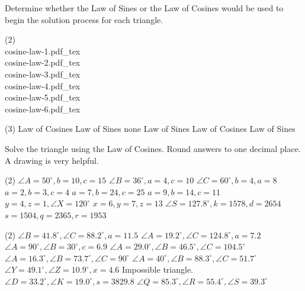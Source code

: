 \documentclass[12pt,fleqn]{book}
\newcommand{\incfig}[2][1]{%
    \def\svgwidth{#1\columnwidth}
    {#2.pdf_tex}
}
\newcommand{\prb}[1]{\begin{Exercise}\parbox[t]{\textwidth-5em}{#1}\end{Exercise}}
\newcommand{\sol}[1]{\begin{Answer}\parbox[t]{\textwidth-5em}{#1}\end{Answer}}
\begin{document}
\clearpage
\prb{
	Determine whether the Law of Sines or the Law of Cosines would be used to begin the solution process for each triangle.
	\begin{tasks}(2)
		\task \\ \incfig[0.8]{cosine-law-1} \vspace{8em}
		\task \\ \incfig[0.8]{cosine-law-2} \vspace{8em}
		\task \\ \incfig[0.8]{cosine-law-3} \vspace{8em}
		\task \\ \incfig[0.8]{cosine-law-4} \vspace{8em}
		\task \\ \incfig[0.8]{cosine-law-5} \vspace{8em}
		\task \\ \incfig[0.8]{cosine-law-6} \vspace{8em}
	\end{tasks}
}
\sol{
	\begin{tasks}(3)
		\task Law of Cosines
		\task Law of Sines
		\task none
		\task Law of Sines
		\task Law of Cosines 
		\task Law of Sines
	\end{tasks}
}
\prb{
	Solve the triangle using the Law of Cosines. Round answers to one decimal place.  A drawing is very helpful.
	\begin{tasks}(2) 
		\task $\angle A=50^{\circ}, b=10, c=15$
		\vspace{12em}
		\task $\angle B=36^{\circ}, a=4, c=10$
		\vspace{12em}
		\task $\angle C=60^{\circ}, b=4, a=8$
		\vspace{12em}
		\task $a=2, b=3, c=4$
		\vspace{12em}
		\task $a=7, b=24, c=25$
		\vspace{12em}
		\task $a=9, b=14, c=11$
		\vspace{12em}
		\task $y=4, z=1, \angle X=120^{\circ}$
		\vspace{12em}
		\task $x=6, y=7, z=13$
		\vspace{12em}
		\task $\angle S=127.8^{\circ}, k=1578, d=2654$
		\vspace{12em}
		\task $s=1504, q=2365, r=1953$
		\vspace{12em}
	\end{tasks}
}
\sol{
	\begin{tasks}(2)
		\task $\angle B=41.8^{\circ}, \angle C=88.2^{\circ}, a=11.5$
		\task $\angle A=19.2^{\circ}, \angle C=124.8^{\circ}, a=7.2$
		\task $\angle A=90^{\circ}, \angle B=30^{\circ}, c=6.9$
		\task $\angle A=29.0^{\circ}, \angle B=46.5^{\circ}, \angle C=104.5^{\circ}$
		\task $\angle A=16.3^{\circ}, \angle B=73.7^{\circ}, \angle C=90^{\circ}$
		\task $\angle A=40^{\circ}, \angle B=88.3^{\circ}, \angle C=51.7^{\circ}$
		\task $\angle Y=49.1^{\circ}, \angle Z=10.9^{\circ}, x=4.6$
		\task Impossible triangle.
		\task $\angle D=33.2^{\circ}, \angle K=19.0^{\circ}, s=3829.8$
		\task $\angle Q=85.3^{\circ}, \angle R=55.4^{\circ}, \angle S=39.3^{\circ}$
	\end{tasks}
}
\end{document}
